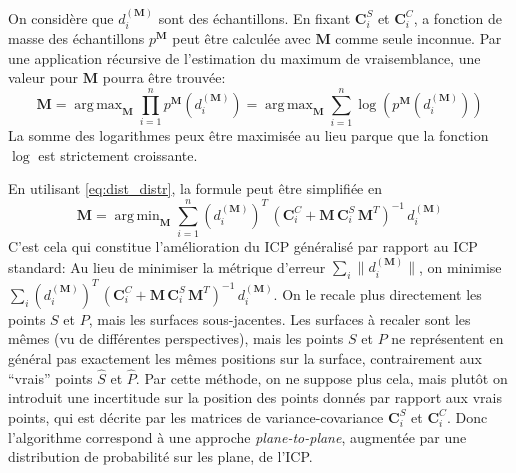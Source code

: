 \documentclass[a4paper,10pt]{scrreprt}
\DeclareMathOperator*{\argmax}{arg\,max}
\DeclareMathOperator*{\argmin}{arg\,min}
\begin{document}
On considère que $d^{(\mathbf{M})}_i$ sont des échantillons. En fixant $\mathbf{C}^S_i$ et $\mathbf{C}^C_i$, a fonction de masse des échantillons $p^{\mathbf{M}}$ peut être calculée avec $\mathbf{M}$ comme seule inconnue. Par une application récursive de l'estimation du maximum de vraisemblance, une valeur pour $\mathbf{M}$ pourra être trouvée:
\begin{equation}
	\mathbf{M}
	= \argmax_{\mathbf{M}} \prod_{i=1}^{n} p^{\mathbf{M}}(d^{(\mathbf{M})}_i)
	= \argmax_{\mathbf{M}} \sum_{i=1}^{n} \log(p^{\mathbf{M}}(d^{(\mathbf{M})}_i))
\end{equation}
La somme des logarithmes peux être maximisée au lieu parque que la fonction $\log$ est strictement croissante.

En utilisant \ref{eq:dist_distr}, la formule peut être simplifiée en
\begin{equation}
	\mathbf{M} = \argmin_{\mathbf{M}} \sum_{i=1}^{n}
	(d^{(\mathbf{M})}_i)^T \, (\mathbf{C}^C_i + \mathbf{M}\,\mathbf{C}^S_i\,\mathbf{M}^T)^{-1} \, d^{(\mathbf{M})}_i
\end{equation}
C'est cela qui constitue l'amélioration du ICP généralisé par rapport au ICP standard: Au lieu de minimiser la métrique d'erreur $\sum_i \| d^{(\mathbf{M})}_i \|$, on minimise $\sum_i (d^{(\mathbf{M})}_i)^T \, (\mathbf{C}^C_i + \mathbf{M}\,\mathbf{C}^S_i\,\mathbf{M}^T)^{-1} \, d^{(\mathbf{M})}_i$. On le recale plus directement les points $S$ et $P$, mais les surfaces sous-jacentes. Les surfaces à recaler sont les mêmes (vu de différentes perspectives), mais les points $S$ et $P$ ne représentent en général pas exactement les mêmes positions sur la surface, contrairement aux  ``vrais'' points $\hat{S}$ et $\hat{P}$. Par cette méthode, on ne suppose plus cela, mais plutôt on introduit une incertitude sur la position des points donnés par rapport aux vrais points, qui est décrite par les matrices de variance-covariance $\mathbf{C}^S_i$ et $\mathbf{C}^C_i$. Donc l'algorithme correspond à une approche \emph{plane-to-plane}, augmentée par une distribution de probabilité sur les plane, de l'ICP.
\end{document}
